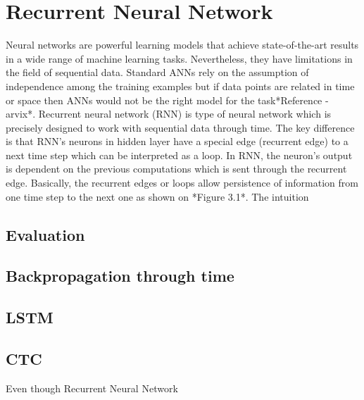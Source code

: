 \chapter{Recurrent Neural Network}

Neural networks are powerful learning models that achieve state-of-the-art results in a wide range of machine learning tasks.
Nevertheless, they have limitations in the field of sequential data.
Standard ANNs rely on the assumption of independence among the training examples but if data points are related in time or space then ANNs would not be the right model for the task*Reference - arvix*.
\newline
Recurrent neural network (RNN) is type of neural network which is precisely designed to work with sequential data through time.
The key difference is that RNN's neurons in hidden layer have a special edge (recurrent edge) to a next time step which can be interpreted as a loop.
In RNN, the neuron's output is dependent on the previous computations which is sent through the recurrent edge.
Basically, the recurrent edges or loops allow persistence of information from one time step to the next one as shown on *Figure 3.1*.
The intuition



\section{Evaluation}

\section{Backpropagation through time}

\section{LSTM}

\section{CTC}

Even though
Recurrent Neural Network
